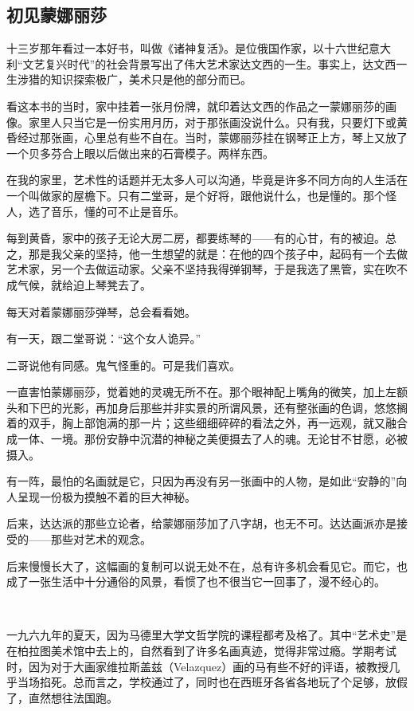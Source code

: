 \subsection{初见蒙娜丽莎}


\par 十三岁那年看过一本好书，叫做《诸神复活》。是位俄国作家，以十六世纪意大利“文艺复兴时代”的社会背景写出了伟大艺术家达文西的一生。事实上，达文西一生涉猎的知识探索极广，美术只是他的部分而已。
\par 看这本书的当时，家中挂着一张月份牌，就印着达文西的作品之一蒙娜丽莎的画像。家里人只当它是一份实用月历，对于那张画没说什么。只有我，只要灯下或黄昏经过那张画，心里总有些不自在。当时，蒙娜丽莎挂在钢琴正上方，琴上又放了一个贝多芬合上眼以后做出来的石膏模子。两样东西。
\par 在我的家里，艺术性的话题并无太多人可以沟通，毕竟是许多不同方向的人生活在一个叫做家的屋檐下。只有二堂哥，是个好将，跟他说什么，也是懂的。那个怪人，选了音乐，懂的可不止是音乐。
\par 每到黄昏，家中的孩子无论大房二房，都要练琴的——有的心甘，有的被迫。总之，那是我父亲的坚持，他一生想望的就是：在他的四个孩子中，起码有一个去做艺术家，另一个去做运动家。父亲不坚持我得弹钢琴，于是我选了黑管，实在吹不成气候，就给迫上琴凳去了。
\par 每天对着蒙娜丽莎弹琴，总会看看她。
\par 有一天，跟二堂哥说：“这个女人诡异。”
\par 二哥说他有同感。鬼气怪重的。可是我们喜欢。
\par 一直害怕蒙娜丽莎，觉着她的灵魂无所不在。那个眼神配上嘴角的微笑，加上左额头和下巴的光影，再加身后那些并非实景的所谓风景，还有整张画的色调，悠悠搁着的双手，胸上部饱满的那一片；这些细细碎碎的看法之外，再一远观，就又融合成一体、一境。那份安静中沉潜的神秘之美便摄去了人的魂。无论甘不甘愿，必被摄入。
\par 有一阵，最怕的名画就是它，只因为再没有另一张画中的人物，是如此“安静的”向人呈现一份极为摸触不着的巨大神秘。
\par 后来，达达派的那些立论者，给蒙娜丽莎加了八字胡，也无不可。达达画派亦是接受的——那些对艺术的观念。
\par 后来慢慢长大了，这幅画的复制可以说无处不在，总有许多机会看见它。而它，也成了一张生活中十分通俗的风景，看惯了也不很当它一回事了，漫不经心的。
\par  
\par 一九六九年的夏天，因为马德里大学文哲学院的课程都考及格了。其中“艺术史”是在柏拉图美术馆中去上的，自然看到了许多名画真迹，觉得非常过瘾。学期考试时，因为对于大画家维拉斯盖兹（Velazquez）画的马有些不好的评语，被教授几乎当场掐死。总而言之，学校通过了，同时也在西班牙各省各地玩了个足够，放假了，直然想往法国跑。
